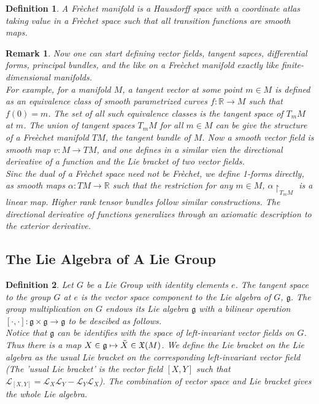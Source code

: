 \documentclass{article}
\newtheorem{defn}{Definition}
\newtheorem{rmk}{Remark}
\begin{document}
\begin{defn}

A \textit{Fr\`echet manifold} is a Hausdorff space with a coordinate atlas taking value in a Fr\`echet space such that all transition functions are smooth maps.

\end{defn}



\begin{rmk}

	Now one can start defining vector fields, tangent sapces, differential forms, principal bundles, and the like on a Fre\`echet manifold exactly like finite-dimensional manifolds. \\
	\indent For example, for a manifold $M$, a \textit{tangent vector} at some point $m \in M$ is defined as an equivalence class of smooth parametrized curves $ f: \mathbb{R} \to M$ such that $f(0)=m$. The set of all such equivalence classes is the \textit{tangent space} of $T_m M$ at $m$. The union of tangent spaces $T_m M$ for all $m \in M$ can be give the structure of a Fre\`echet manifold $TM$, the tangent bundle of $M$. Now a smooth vector field is smooth map $ v: M \to TM$, and one defines in a similar vien the directional derivative of a function and the Lie bracket of two vector fields.\\ 
	\indent Sinc the dual of a Fr\`echet space need not be Fr\`echet, we define 1-forms directly, as smooth maps $ \alpha: TM \to \mathbb{R}$ such that the restriction for any $m \in M$, $\alpha \restriction_{T_m M}$ is a linear map. Higher rank tensor bundles follow similar constructions. The directional derivative of functions generalizes through an axiomatic description to the exterior derivative. 
\end{rmk}

\subsection{The Lie Algebra of A Lie Group}
\begin{defn}

	Let $G$ be a Lie Group with identity elements $e$. The tangent space to the group $G$ at $e$ is the vector space component to the \textit{Lie algebra} of $G$, $\mathfrak{g}$. The group multiplication on $G$ endows its Lie algebra $\mathfrak{g}$ with a bilinear operation $[\cdot, \cdot]: \mathfrak{g} \times \mathfrak{g} \to \mathfrak{g}$ to be descibed as follows. \\
	\indent Notice that $\mathfrak{g}$ can be identifies with the space of left-invariant vector fields on $G$. Thus there is a map $X \in \mathfrak{g} \mapsto \Tilde{X} \in \mathfrak{X}(M)$. We define the Lie bracket on the Lie algebra as the usual Lie bracket on the corresponding left-invariant vector field (The 'usual Lie bracket' is the vector field $[X,Y]$ such that $\mathcal{L}_{[X,Y]}=\mathcal{L}_X \mathcal{L}_Y - \mathcal{L}_Y \mathcal{L}_X$). The combination of vector space and Lie bracket gives the whole \textit{Lie algebra}.

\end{defn}
\end{document}
